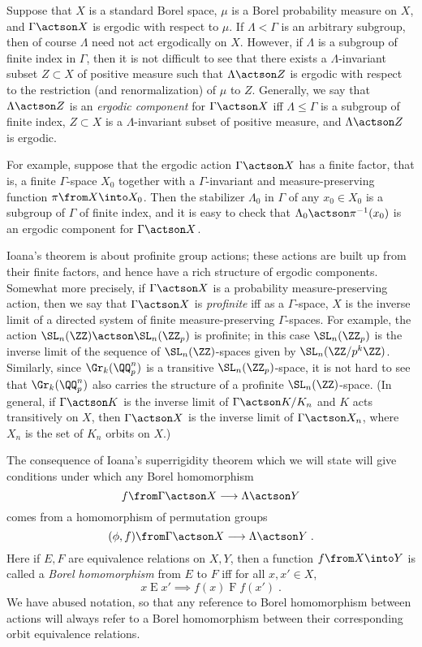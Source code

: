 \documentclass[oneside,leqno,11pt]{amsart}
\begin{document}
Suppose that $X$ is a standard Borel space, $\mu$ is a Borel
probability measure on $X$, and $\Gamma\actson X$ is ergodic with
respect to $\mu$.  If $\Lambda<\Gamma$ is an arbitrary subgroup, then
of course $\Lambda$ need not act ergodically on $X$.  However, if
$\Lambda$ is a subgroup of finite index in $\Gamma$, then it is not
difficult to see that there exists a $\Lambda$-invariant subset
$Z\subset X$ of positive measure such that $\Lambda\actson Z$ is
ergodic with respect to the restriction (and renormalization) of $\mu$
to $Z$.  Generally, we say that $\Lambda\actson Z$ is an \emph{ergodic
  component} for $\Gamma\actson X$ iff $\Lambda\leq\Gamma$ is a
subgroup of finite index, $Z\subset X$ is a $\Lambda$-invariant subset
of positive measure, and $\Lambda\actson Z$ is ergodic.

For example, suppose that the ergodic action $\Gamma\actson X$ has a
finite factor, that is, a finite $\Gamma$-space $X_0$ together with a
$\Gamma$-invariant and measure-preserving function $\pi\from X\into
X_0$.  Then the stabilizer $\Lambda_0$ in $\Gamma$ of any $x_0\in X_0$
is a subgroup of $\Gamma$ of finite index, and it is easy to check
that $\Lambda_0\actson\pi^{-1}(x_0)$ is an ergodic component for
$\Gamma\actson X$.

Ioana's theorem is about profinite group actions; these actions are
built up from their finite factors, and hence have a rich structure of
ergodic components.  Somewhat more precisely, if $\Gamma\actson X$ is
a probability measure-preserving action, then we say that
$\Gamma\actson X$ is \emph{profinite} iff as a $\Gamma$-space, $X$ is
the inverse limit of a directed system of finite measure-preserving
$\Gamma$-spaces.  For example, the action
$\SL_n(\ZZ)\actson\SL_n(\ZZ_p)$ is profinite; in this case
$\SL_n(\ZZ_p)$ is the inverse limit of the sequence of
$\SL_n(\ZZ)$-spaces given by $\SL_n(\ZZ/p^k\ZZ)$.  Similarly, since
$\Gr_k(\QQ_p^n)$ is a transitive $\SL_n(\ZZ_p)$-space, it is not hard
to see that $\Gr_k(\QQ_p^n)$ also carries the structure of a profinite
$\SL_n(\ZZ)$-space.  (In general, if $\Gamma\actson K$ is the inverse
limit of $\Gamma\actson K/K_n$ and $K$ acts transitively on $X$, then
$\Gamma\actson X$ is the inverse limit of $\Gamma\actson X_n$, where
$X_n$ is the set of $K_n$ orbits on $X$.)

The consequence of Ioana's superrigidity theorem which we will state
will give conditions under which any Borel homomorphism
\[f\from\Gamma\actson X\longrightarrow\Lambda\actson Y
\]
comes from a homomorphism of permutation groups
\[(\phi,f)\from\Gamma\actson X\longrightarrow\Lambda\actson Y\;.
\]
Here if $E,F$ are equivalence relations on $X,Y$, then a function
$f\from X\into Y$ is called a \emph{Borel homomorphism} from $E$ to
$F$ iff for all $x,x'\in X$,
\[x\mathrel{E}x'\implies f(x)\mathrel{F}f(x')\;.
\]
We have abused notation, so that any reference to Borel homomorphism
between actions will always refer to a Borel homomorphism between
their corresponding orbit equivalence relations.
\end{document}
